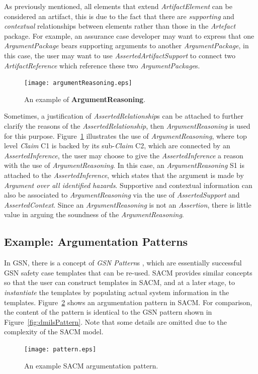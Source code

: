 As previously mentioned, all elements that extend \textit{ArtifactElement} can be considered an artifact, this is due to the fact that there are \textit{supporting} and \textit{contextual} relationships between elements rather than those in the \textit{Artefact} package. 
For example, an assurance case developer may want to express that one \textit{ArgumentPackage} bears supporting arguments to another \textit{ArgumentPackage}, in this case, the user may want to use \textit{AssertedArtifactSupport} to connect two \textit{ArtifactReference} which reference these two \textit{ArgumentPackage}s. 

\begin{figure}
	\centering
	\texttt{[image: argumentReasoning.eps]}
	\caption{An example of \textbf{ArgumentReasoning}.}
	\label{fig:argumentReasoning}
\end{figure}

Sometimes, a justification of \textit{AssertedRelationship}s can be attached to further clarify the reasons of the \textit{AssertedRelationship}, then \textit{ArgumentReasoning} is used for this purpose. Figure~\ref{fig:argumentReasoning} illustrates the use of \textit{ArgumentReasoning}, where top level \textit{Claim} C1 is backed by its sub-\textit{Claim} C2, which are connected by an \textit{AssertedInference}, the user may choose to give the \textit{AssertedInference} a reason with the use of \textit{ArgumentReasoning}. 
In this case, an \textit{ArgumentReasoning} S1 is attached to the \textit{AssertedInference}, which states that the argument is made by \textit{Argument over all identified hazards}. 
Supportive and contextual information can also be associated to \textit{ArgumentReasoning} via the use of \textit{AssertedSupport} and \textit{AssertedContext}. 
Since an \textit{ArgumentReasoning} is not an \textit{Assertion}, there is little value in arguing the soundness of the \textit{ArgumentReasoning}. 



\subsection{Example: Argumentation Patterns}
\label{sec:patterns}
In GSN, there is a concept of \textit{GSN Pattern}s \cite{kelly1997safety}, which are essentially successful GSN safety case templates that can be re-used. 
SACM provides similar concepts so that the user can construct templates in SACM, and at a later stage, to \textit{instantiate} the templates by populating actual system information in the templates. 
Figure~\ref{fig:sacmPattern} shows an argumentation pattern in SACM. For comparison, the content of the pattern is identical to the GSN pattern shown in Figure~\ref{fig:dmilsPattern}. 
Note that some details are omitted due to the complexity of the SACM model.
\begin{figure}
	\centering
	\texttt{[image: pattern.eps]}
	\caption{An example SACM argumentation pattern.}
	\label{fig:sacmPattern}
\end{figure}

